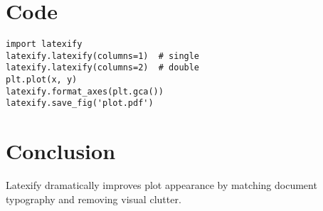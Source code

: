 \documentclass[twocolumn]{article}
\begin{document}
\section{Code}

\begin{verbatim}
import latexify
latexify.latexify(columns=1)  # single
latexify.latexify(columns=2)  # double
plt.plot(x, y)
latexify.format_axes(plt.gca())
latexify.save_fig('plot.pdf')
\end{verbatim}

\section{Conclusion}

Latexify dramatically improves plot appearance by matching document typography and removing visual clutter.
\end{document}

